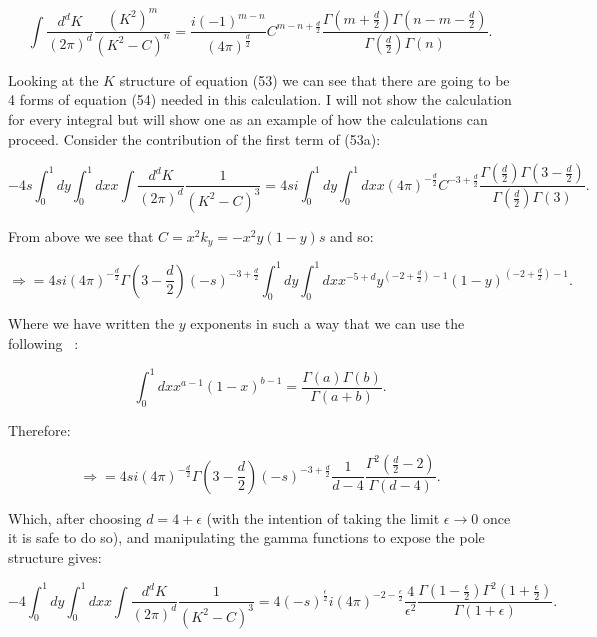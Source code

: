 	\begin{equation}
	\int\frac{d^{d}K}{(2\pi)^d}\frac{(K^2)^m}{(K^2-C)^n} = \frac{i(-1)^{m-n}}{(4\pi)^\frac{d}{2}}C^{m-n+\frac{d}{2}}\frac{\Gamma(m+\frac{d}{2})\Gamma(n-m-\frac{d}{2})}{\Gamma(\frac{d}{2})\Gamma(n)}.
	\end{equation}

	Looking at the $K$ structure of equation (53) we can see that there are going to be 4 forms
	of equation (54) needed in this calculation.  I will not show the calculation for every integral
	but will show one as an example of how the calculations can proceed.  Consider the contribution of the first term of (53a):

	\begin{equation}
	-4s\int_0^1dy\int_0^1dxx\int\frac{d^{d}K}{(2\pi)^d}\frac{1}{(K^2-C)^3} = 4si\int_0^1dy\int_0^1dxx(4\pi)^{-\frac{d}{2}}C^{-3+\frac{d}{2}}\frac{\Gamma(\frac{d}{2})\Gamma(3-\frac{d}{2})}{\Gamma(\frac{d}{2})\Gamma(3)}.
	\end{equation}

	From above we see that $C=x^2k_y=-x^2y(1-y)s$ and so:

	\begin{equation}
	\Rightarrow=4si(4\pi)^{-\frac{d}{2}}\Gamma(3-\frac{d}{2})(-s)^{-3+\frac{d}{2}}\int_0^1dy\int_0^1dxx^{-5+d}y^{\left(-2+\frac{d}{2}\right)-1}(1-y)^{\left(-2+\frac{d}{2}\right)-1}.
	\end{equation}

	Where we have written the $y$ exponents in such a way that we can use the following ~\cite{field}:

	\begin{equation}
	\int_0^1dxx^{a-1}(1-x)^{b-1}=\frac{\Gamma(a)\Gamma(b)}{\Gamma(a+b)}.
	\end{equation}

	Therefore:

	\begin{equation}
	\Rightarrow=4si(4\pi)^{-\frac{d}{2}}\Gamma\left(3-\frac{d}{2}\right)(-s)^{-3+\frac{d}{2}}\frac{1}{d-4}\frac{\Gamma^2(\frac{d}{2}-2)}{\Gamma(d-4)}.
	\end{equation}

	Which, after choosing $d=4+\epsilon$ (with the intention of taking the limit $\epsilon\rightarrow0$
	once it is safe to do so), and manipulating the gamma functions to expose the pole structure gives:

	\begin{equation}
	-4\int_0^1dy\int_0^1dxx\int\frac{d^{d}K}{(2\pi)^d}\frac{1}{(K^2-C)^3} = 4(-s)^{\frac{\epsilon}{2}}i(4\pi)^{-2-\frac{\epsilon}{2}}\frac{4}{\epsilon^2}\frac{\Gamma\left(1-\frac{\epsilon}{2}\right)\Gamma^2\left(1+\frac{\epsilon}{2}\right)}{\Gamma(1+\epsilon)}.
	\end{equation}

